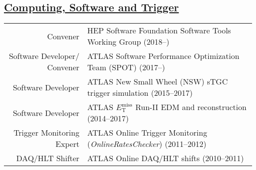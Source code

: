 \documentclass[a4paper,10pt]{article}
\begin{document}
\subsection{\underline{Computing, Software and Trigger}}
\vspace{1mm}
\begin{tabular}{r | p{12.7cm}}
\multicolumn{1}{r|}{Convener}					& HEP Software Foundation Software Tools Working Group \hfill (2018--\phantom{0000})		\\
\multicolumn{1}{r|}{Software Developer/ Convener}	& ATLAS Software Performance Optimization Team (SPOT) \hfill (2017--\phantom{0000})		\\
\multicolumn{1}{r|}{Software Developer}			& ATLAS New Small Wheel (NSW) sTGC trigger simulation \hfill (2015--2017)				\\
\multicolumn{1}{r|}{Software Developer}			& ATLAS $E_{\mathrm{T}}^{\mathrm{miss}}$ Run-II EDM and reconstruction \hfill (2014--2017)	\\
\multicolumn{1}{r|}{Trigger Monitoring Expert}		& ATLAS Online Trigger Monitoring ({\it OnlineRatesChecker})  \hfill (2011--2012)			\\
\multicolumn{1}{r|}{DAQ/HLT Shifter}				& ATLAS Online DAQ/HLT shifts	\hfill (2010--2011)								\\
\end{tabular}
\vspace{1mm}
\end{document}
